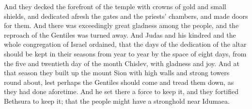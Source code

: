 {And they decked the forefront of the temple with crowns of gold and small shields, and dedicated afresh the gates and the priests’ chambers, and made doors for them.
And there was exceedingly great gladness among the people, and the reproach of the Gentiles was turned away.
And Judas and his kindred and the whole congregation of Israel ordained, that the days of the dedication of the altar should be kept in their seasons from year to year by the space of eight days, from the five and twentieth day of the month Chislev, with gladness and joy.
And at that season they built up the mount Sion with high walls and strong towers round about, lest perhaps the Gentiles should come and tread them down, as they had done aforetime.
And he set there a force to keep it, and they fortified Bethsura to keep it; that the people might have a stronghold near Idumaea.

}
